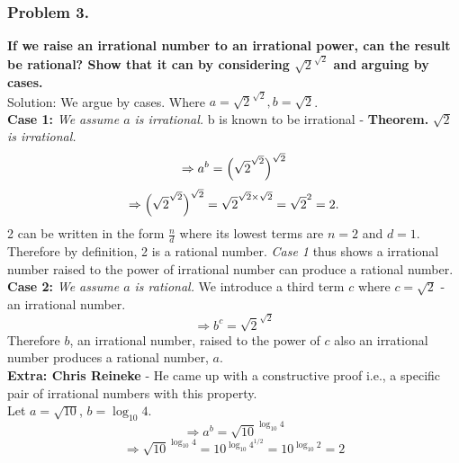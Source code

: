 \documentclass{article}
\begin{document}
\subsubsection{Problem 3.}
\textbf{If we raise an irrational number to an irrational power, can the result be rational? Show that it can by considering $\sqrt{2}^{\sqrt{2}}$ and arguing by cases.}
\\[5pt]
Solution: We argue by cases. Where \(a = \sqrt{2}^{\sqrt{2}}, b = \sqrt{2}\).
\\[5pt]
\textbf{Case 1:} \textit{We assume $a$ is irrational.}
b is known to be irrational - \textbf{Theorem.} \textit{$\sqrt{2}$ is irrational.} 
\[\Rightarrow a^{b} = \Bigl(\sqrt{2}^{\sqrt{2}}\Bigr)^{\sqrt{2}}\]
\[\Rightarrow \Bigl(\sqrt{2}^{\sqrt{2}}\Bigr)^{\sqrt{2}} = \sqrt{2}^{\sqrt{2} \times \sqrt{2}} = \sqrt{2}^{2} = 2.\]
2 can be written in the form $\frac{n}{d}$ where its lowest terms are $n = 2$ and $d = 1$. Therefore by definition, 2 is a rational number. \textit{Case 1} thus shows a irrational number raised to the power of irrational number can produce a rational number.
\\[5pt]
\noindent
\textbf{Case 2:} \textit{We assume $a$ is rational.} We introduce a third term $c$ where $c = \sqrt{2}$ - an irrational number. 
\[\Rightarrow b^{c} = \sqrt{2}^{\sqrt{2}}\]
Therefore $b$, an irrational number, raised to the power of $c$ also an irrational number produces a rational number, $a$.
\\[5pt]
\noindent
\textbf{Extra: Chris Reineke} - He came up with a constructive proof i.e., a specific pair of irrational numbers with this property. 
\\[5pt]
\noindent
Let $a = \sqrt{10}$,  $b = \log_{10}4$.
\[\Rightarrow a^{b} = \sqrt{10}^{\log_{10}4}\]
\[\Rightarrow \sqrt{10}^{\log_{10}4} = 10^{\log_{10}4^{1/2}} = 10^{\log_{10}2} = 2\]
\end{document}
